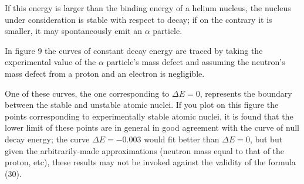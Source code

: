 \documentclass[a4paper,11pt]{article}
\newcommand{\?}[2]{#1\footnote{\textsc{Translator note}: #2}}
\begin{document}
{{If this energy is larger than the binding energy of a helium nucleus, the nucleus under consideration is stable with respect to decay; if on the contrary it is smaller, it may spontaneously emit an $\alpha$ particle.

In figure 9 the curves of constant decay energy are traced by taking the experimental value of the $\alpha$ particle's mass defect and assuming the neutron's mass defect from a proton and an electron is negligible.

One of these curves, the one corresponding to $\Delta E = 0$, represents the boundary between the stable and unstable atomic nuclei. If you plot on this figure the points corresponding to experimentally stable atomic nuclei, it is found that the lower limit of these points are in general in good agreement with the curve of null decay energy; the curve $\Delta E = -0.003$ would fit better than $\Delta E=0$, but but given the arbitrarily-made approximations (neutron mass equal to that of the proton, etc), these results may not be invoked against the validity of the formula (30).

}}
\end{document}
